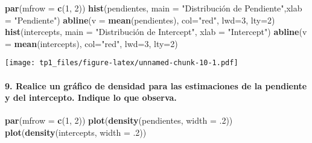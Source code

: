 \documentclass[
]{article}
\newenvironment{Shaded}{\begin{snugshade}}{\end{snugshade}}
\newcommand{\AttributeTok}[1]{\textcolor[rgb]{0.13,0.29,0.53}{#1}}
\newcommand{\DecValTok}[1]{\textcolor[rgb]{0.00,0.00,0.81}{#1}}
\newcommand{\FunctionTok}[1]{\textcolor[rgb]{0.13,0.29,0.53}{\textbf{#1}}}
\newcommand{\NormalTok}[1]{#1}
\newcommand{\StringTok}[1]{\textcolor[rgb]{0.31,0.60,0.02}{#1}}
\begin{document}
\begin{Shaded}
\begin{Highlighting}[]
\FunctionTok{par}\NormalTok{(}\AttributeTok{mfrow =} \FunctionTok{c}\NormalTok{(}\DecValTok{1}\NormalTok{, }\DecValTok{2}\NormalTok{))}
\FunctionTok{hist}\NormalTok{(pendientes, }\AttributeTok{main =} \StringTok{"Distribución de Pendiente"}\NormalTok{,}\AttributeTok{xlab =} \StringTok{"Pendiente"}\NormalTok{)}
\FunctionTok{abline}\NormalTok{(}\AttributeTok{v =} \FunctionTok{mean}\NormalTok{(pendientes), }\AttributeTok{col=}\StringTok{"red"}\NormalTok{, }\AttributeTok{lwd=}\DecValTok{3}\NormalTok{, }\AttributeTok{lty=}\DecValTok{2}\NormalTok{)}
\FunctionTok{hist}\NormalTok{(intercepts, }\AttributeTok{main =} \StringTok{"Distribución de Intercept"}\NormalTok{, }\AttributeTok{xlab =} \StringTok{"Intercept"}\NormalTok{)}
\FunctionTok{abline}\NormalTok{(}\AttributeTok{v =} \FunctionTok{mean}\NormalTok{(intercepts), }\AttributeTok{col=}\StringTok{"red"}\NormalTok{, }\AttributeTok{lwd=}\DecValTok{3}\NormalTok{, }\AttributeTok{lty=}\DecValTok{2}\NormalTok{)}
\end{Highlighting}
\end{Shaded}

\texttt{[image: tp1\_files/figure-latex/unnamed-chunk-10-1.pdf]}

\hypertarget{realice-un-gruxe1fico-de-densidad-para-las-estimaciones-de-la-pendiente-y-del-intercepto.-indique-lo-que-observa.}{%
\paragraph{9. Realice un gráfico de densidad para las estimaciones de la
pendiente y del intercepto. Indique lo que
observa.}\label{realice-un-gruxe1fico-de-densidad-para-las-estimaciones-de-la-pendiente-y-del-intercepto.-indique-lo-que-observa.}}

\begin{Shaded}
\begin{Highlighting}[]
\FunctionTok{par}\NormalTok{(}\AttributeTok{mfrow =} \FunctionTok{c}\NormalTok{(}\DecValTok{1}\NormalTok{, }\DecValTok{2}\NormalTok{))}
\FunctionTok{plot}\NormalTok{(}\FunctionTok{density}\NormalTok{(pendientes, }\AttributeTok{width =}\NormalTok{ .}\DecValTok{2}\NormalTok{))}
\FunctionTok{plot}\NormalTok{(}\FunctionTok{density}\NormalTok{(intercepts, }\AttributeTok{width =}\NormalTok{ .}\DecValTok{2}\NormalTok{))}
\end{Highlighting}
\end{Shaded}
\end{document}

